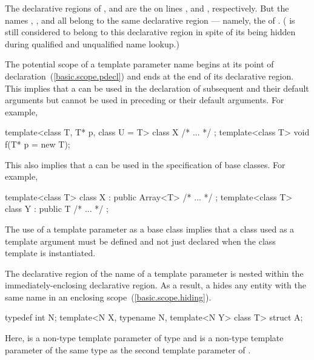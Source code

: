 The declarative regions of ,  and  are the
 on lines ,  and ,
respectively. But the names , ,  and  all belong to
the same declarative region --- namely, the  of .
( is still considered to belong to this declarative region in spite of its
being hidden during qualified and unqualified name lookup.)
\exitexample

\pnum
The potential scope of a template parameter name begins at its point of
declaration~(\ref{basic.scope.pdecl}) and ends at the end of its declarative region.
\enternote This implies that a  can be used in the
declaration of subsequent  and their default
arguments but cannot be used in preceding  or their
default arguments. For example,

\begin{codeblock}
template<class T, T* p, class U = T> class X { /* ... */ };
template<class T> void f(T* p = new T);
\end{codeblock}

This also implies that a  can be used in the
specification of base classes. For example,

\begin{codeblock}
template<class T> class X : public Array<T> { /* ... */ };
template<class T> class Y : public T { /* ... */ };
\end{codeblock}

The use of a template parameter as a base class implies that a class used as a template
argument must be defined and not just declared when the class template is instantiated.
\exitnote

\pnum
The declarative region of the name of a template parameter is nested within the
immediately-enclosing declarative region. \enternote As a result, a
 hides any entity with the same name in an enclosing
scope~(\ref{basic.scope.hiding}). \enterexample

\begin{codeblock}
typedef int N;
template<N X, typename N, template<N Y> class T> struct A;
\end{codeblock}

Here,  is a non-type template parameter of type  and  is a
non-type template parameter of the same type as the second template parameter of
. \exitexample\exitnote

